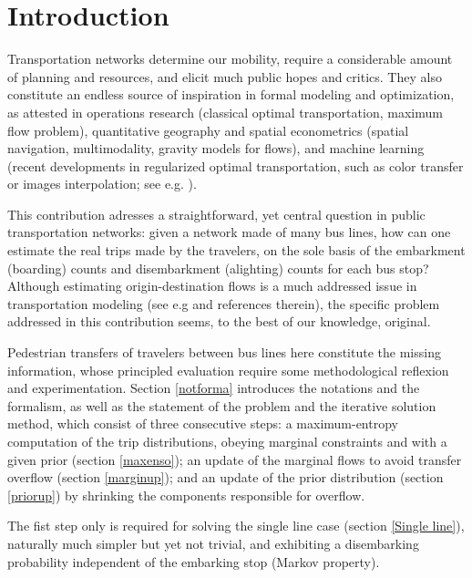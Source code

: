 \documentclass{bmcart}
\begin{document}


\section{Introduction}
Transportation networks determine our mobility, require a considerable amount of planning and resources, and elicit much public hopes and critics. 
They also constitute an endless source of inspiration in formal modeling and optimization, as attested in operations research (classical optimal transportation, maximum flow problem), quantitative geography and spatial econometrics (spatial navigation, multimodality, gravity models for flows), and machine learning (recent developments in regularized optimal transportation, such as color transfer or images interpolation; see e.g. \cite{peyre2019computational}). 

This contribution adresses a straightforward, yet central question  in public transportation networks: given a network made of many bus lines, how can one estimate the real trips made by the travelers, on the sole basis of  the embarkment (boarding) counts and disembarkment (alighting) counts for each bus stop? Although estimating origin-destination flows is a much addressed issue in transportation modeling (see e.g \cite{bell1997transportation} \cite{hazelton2000estimation} \cite{ashok2002estimation} \cite{cui2006bus} and references therein), the specific problem addressed in this contribution seems, to the best of our knowledge, original. 


Pedestrian transfers of travelers between bus lines here constitute the missing information, whose principled evaluation require some methodological reflexion and experimentation. Section \ref{notforma} introduces the notations and the formalism, as well as the statement of the problem and the iterative solution method, which consist of three consecutive steps: a maximum-entropy computation of the trip distributions, obeying marginal constraints and with a given prior (section \ref{maxenso}); an update of the marginal flows to avoid transfer overflow (section \ref{marginup}); and an update of the prior distribution  (section \ref{priorup}) by shrinking the components responsible for overflow. 

The fist step only is required for solving the single line case (section \ref{Single line}), naturally much simpler but  yet  not trivial, and exhibiting a disembarking probability independent of the embarking stop (Markov property). 
\end{document}
